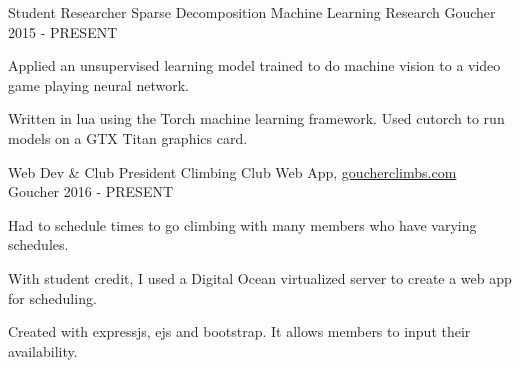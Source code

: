 

\begin{cventries}

  \cventry
    {Student Researcher} %
    {Sparse Decomposition Machine Learning Research} %
    {Goucher} %
    {2015 - PRESENT} %
    {
      \begin{cvitems} %
        \item {Applied an unsupervised learning model trained to do machine vision to a video game playing neural network.}
        \item {Written in lua using the Torch machine learning framework. Used cutorch to run models on a GTX Titan graphics card.}
      \end{cvitems}
    }

  \cventry
    {Web Dev \& Club President} %
    {Climbing Club Web App{\normalfont, \href{http://www.goucherclimbs.com/}{goucherclimbs.com}} } %
    {Goucher} %
    {2016 - PRESENT} %
    {
      \begin{cvitems} %
        \item {Had to schedule times to go climbing with many members who have varying schedules.}
        \item {With student credit, I used a Digital Ocean virtualized server to create a web app for scheduling.}
        \item {Created with  expressjs, ejs and bootstrap. It allows members to input their availability.}
      \end{cvitems}
    }

\end{cventries}
